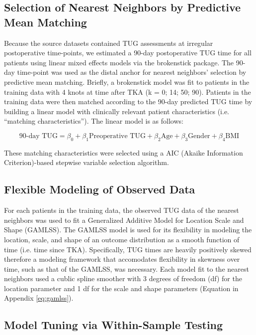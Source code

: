 \documentclass[fleqn,10pt]{wlscirep}\usepackage{knitr}
\begin{document}
\subsection*{Selection of Nearest Neighbors by Predictive Mean Matching}

Because the source datasets contained TUG assessments at irregular postoperative time-points, we estimated a 90-day postoperative TUG time for all patients using linear mixed effects models via the brokenstick package\cite{R-brokenstick}. The 90-day time-point was used as the distal anchor for nearest neighbors' selection by predictive mean matching. Briefly, a brokenstick model\cite{van2014curve} was fit to patients in the training data with 4 knots at time after TKA (k =  0; 14; 50; 90). Patients in the training data were then matched according to the 90-day predicted TUG time by building a linear model with clinically relevant patient characteristics (i.e. ``matching characteristics''). The linear model is as follows:

$$
\text{90-day TUG} = \beta_0 + \beta_1\text{Preoperative TUG} + \beta_2\text{Age} + \beta_3\text{Gender} + \beta_4\text{BMI} 
$$

These matching characteristics were selected using a AIC (Akaike Information Criterion)-based stepwise variable selection algorithm.

\subsection*{Flexible Modeling of Observed Data}

For each patients in the training data, the observed TUG data of the nearest neighbors was used to fit a Generalized Additive Model for Location Scale and Shape (GAMLSS)\cite{R-gamlss,stasinopoulos2007generalized}. The GAMLSS model is used for its flexibility in modeling the location, scale, and shape of an outcome distribution as a smooth function of time (i.e. time since TKA). Specifically, TUG times are heavily positively skewed therefore a modeling framework that accomodates flexibility in  skewness over time, such as that of the GAMLSS, was necessary. Each model fit to the nearest neighbors used a cublic spline smoother with 3 degrees of freedom (df) for the location parameter and 1 df for the scale and shape parameters (Equation in Appendix \ref{eq:gamlss}).

\subsection*{Model Tuning via Within-Sample Testing}
\end{document}
